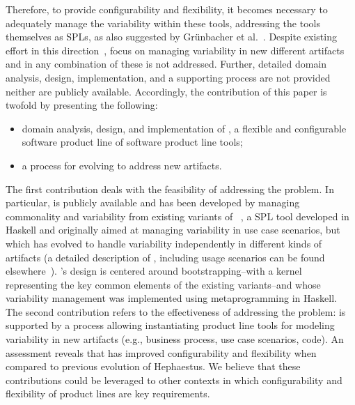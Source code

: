 Therefore, to provide configurability and flexibility, it becomes necessary to adequately manage the variability within these tools, addressing the tools themselves as SPLs, as also suggested by Gr{\"u}nbacher et al.~\cite{grunbacher:2008}. Despite existing effort in this
direction~\cite{grunbacher:2011,grunbacher:2008,batory-ahead-bootstrap}, focus on managing variability in new different artifacts and in any combination of these is not addressed. Further, detailed domain analysis, design, implementation, and a supporting process are not provided neither are publicly available.
Accordingly, the contribution of this paper is twofold by presenting the following:

\begin{itemize}
  \item domain analysis, design, and implementation of \hpl, a flexible and configurable software product line of software product line tools;
  \item a process for evolving \hpl{} to address new artifacts.
\end{itemize}

The first contribution deals with the feasibility of addressing the problem. In particular, \hpl{} is publicly available  and has been developed by managing commonality and variability from existing variants of \hp~\cite{rbonifacio:sbcars2009}, a SPL tool developed in Haskell and originally aimed at managing variability in use case scenarios, but which has evolved to handle variability independently in different kinds of artifacts (a detailed description of \hp, including usage scenarios can be found elsewhere~\cite{rbonifacio:sbcars2009}). \hpl's design is centered around bootstrapping--with a kernel representing the key common elements of the existing \hp{} variants--and whose variability management was implemented using metaprogramming in Haskell. The second contribution refers to the effectiveness of addressing the problem: \hpl{} is supported by a process allowing instantiating product line tools for modeling variability in new artifacts (e.g., business process, use case scenarios, code). An assessment reveals that \hpl{} has improved configurability and flexibility when compared to previous evolution of Hephaestus. We believe that these contributions could be leveraged to other contexts in which configurability and flexibility of product lines are key requirements.


